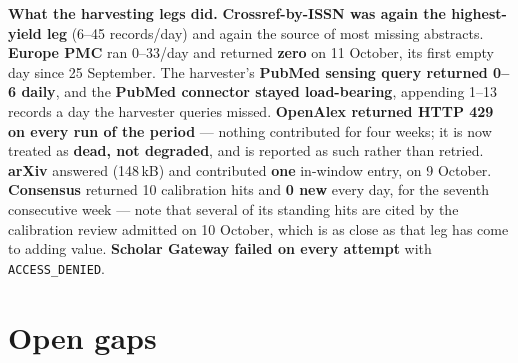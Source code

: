 \documentclass[10pt]{article}
\begin{document}
\vspace{1.5mm}
\textbf{What the harvesting legs did.} \textbf{Crossref-by-ISSN was again the highest-yield leg}
(6--45 records/day) and again the source of most missing abstracts. \textbf{Europe PMC} ran 0--33/day and
returned \textbf{zero} on 11 October, its first empty day since 25 September. The harvester's
\textbf{PubMed sensing query returned 0--6 daily}, and the \textbf{PubMed connector stayed load-bearing},
appending 1--13 records a day the harvester queries missed. \textbf{OpenAlex returned HTTP 429 on every
run of the period} --- nothing contributed for four weeks; it is now treated as \textbf{dead, not
degraded}, and is reported as such rather than retried. \textbf{arXiv} answered (148\,kB) and contributed
\textbf{one} in-window entry, on 9 October. \textbf{Consensus} returned 10 calibration hits and
\textbf{0 new} every day, for the seventh consecutive week --- note that several of its standing hits are
cited by the calibration review admitted on 10 October, which is as close as that leg has come to adding
value. \textbf{Scholar Gateway failed on every attempt} with \texttt{ACCESS\_DENIED}.

\vspace{2mm}
\section*{\sffamily\bfseries\color{Deep}Open gaps}
\vspace{-1.5mm}{\color{Teal}\rule{\linewidth}{1.1pt}}\vspace{2.5mm}
\end{document}
